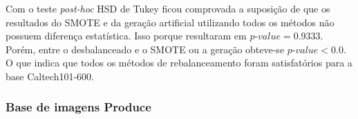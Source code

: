 
Com o teste \textit{post-hoc} HSD de Tukey ficou comprovada a suposição de que os resultados do SMOTE e da geração artificial utilizando todos os métodos não possuem diferença estatística. Isso porque resultaram em $\textit{p-value} = 0.9333$. Porém, entre o desbalanceado e o SMOTE ou a geração obteve-se $\textit{p-value} < 0.0$. O que indica que todos os métodos de rebalanceamento foram satisfatórios para a base Caltech101-600.

\subsubsection{Base de imagens Produce}


